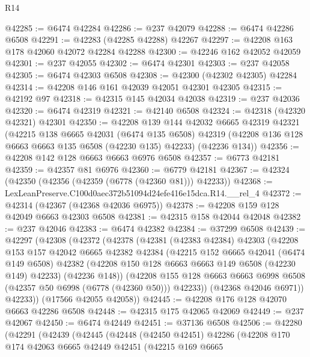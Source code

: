 \begin{lexlean}{R14}
\begin{coremodule}
@42285 := @6474 @42284
@42286 := @237 @42079
@42288 := @6474 @42286 @6508
@42291 := @42283 (@42285 @42288) @42267
@42297 := @42208 @163 @178 @42060 @42072 @42284 @42288
@42300 := @42246 @162 @42052 @42059
@42301 := @237 @42055
@42302 := @6474 @42301
@42303 := @237 @42058
@42305 := @6474 @42303 @6508
@42308 := @42300 (@42302 @42305) @42284
@42314 := @42208 @146 @161 @42039 @42051 @42301 @42305
@42315 := @42192 @97
@42318 := @42315 @145 @42034 @42038
@42319 := @237 @42036
@42320 := @6474 @42319
@42321 := @42140 @6508
@42324 := @42318 (@42320 @42321) @42301
@42350 := @42208
    @139
    @144
    @42032
    @6665
    @42319
    @42321
    (@42215
      @138
      @6665
      @42031
      (@6474 @135 @6508)
      @42319
      (@42208 @136 @128 @6663 @6663 @135 @6508 (@42230 @135) @42233)
      (@42236 @134))
@42356 := @42208 @142 @128 @6663 @6663 @6976 @6508
@42357 := @6773 @42181
@42359 := @42357 @81 @6976
@42360 := @6779 @42181
@42367 := @42324 (@42350 (@42356 (@42359 (@6778 (@42360 @81))) @42233))
@42368 := LexLeanPreserve.C100d0aec372b51094d24efe416e15dca.R14.__rel_4
@42372 := @42314 (@42367 (@42368 @42036 @6975))
@42378 := @42208 @159 @128 @42049 @6663 @42303 @6508
@42381 := @42315 @158 @42044 @42048
@42382 := @237 @42046
@42383 := @6474 @42382
@42384 := @37299 @6508
@42439 := @42297
    (@42308
      (@42372
        (@42378
          (@42381
            (@42383 @42384)
            @42303
            (@42208
              @153
              @157
              @42042
              @6665
              @42382
              @42384
              (@42215
                @152
                @6665
                @42041
                (@6474 @149 @6508)
                @42382
                (@42208 @150 @128 @6663 @6663 @149 @6508 (@42230 @149) @42233)
                (@42236 @148))
              (@42208
                @155
                @128
                @6663
                @6663
                @6998
                @6508
                (@42357 @50 @6998 (@6778 (@42360 @50)))
                @42233))
            (@42368 @42046 @6971))
          @42233))
      (@17566 @42055 @42058))
@42445 := @42208 @176 @128 @42070 @6663 @42286 @6508
@42448 := @42315 @175 @42065 @42069
@42449 := @237 @42067
@42450 := @6474 @42449
@42451 := @37136 @6508
@42506 := @42280
    (@42291
      (@42439
        (@42445
          (@42448
            (@42450 @42451)
            @42286
            (@42208
              @170
              @174
              @42063
              @6665
              @42449
              @42451
              (@42215
                @169
                @6665

\end{coremodule}
\end{lexlean}
